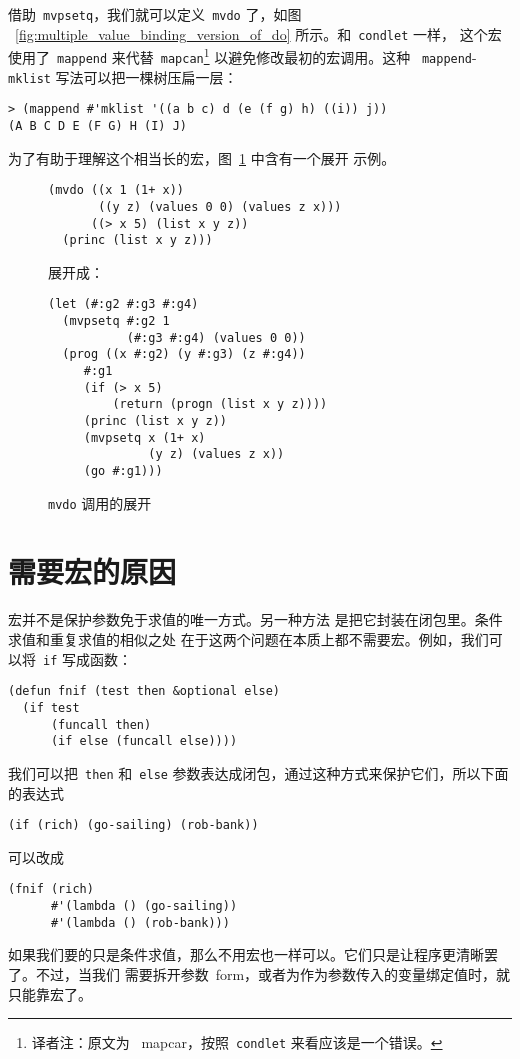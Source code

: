 借助~\verb|mvpsetq|，我们就可以定义~\verb|mvdo| 了，如图
~\ref{fig:multiple_value_binding_version_of_do} 所示。和~\verb|condlet| 一样，
这个宏使用了~\verb|mappend| 来代替~\verb|mapcan|\footnote{译者注：原文为
~mapcar，按照~\texttt{condlet} 来看应该是一个错误。} 以避免修改最初的宏调用。这种
~\verb|mappend|-\verb|mklist| 写法可以把一棵树压扁一层：
\begin{lstlisting}
> (mappend #'mklist '((a b c) d (e (f g) h) ((i)) j))
(A B C D E (F G) H (I) J)
\end{lstlisting}
为了有助于理解这个相当长的宏，图~\ref{fig:expansion_of_a_call_to_mvdo} 中含有一个展开
示例。

\begin{figure}
\begin{lstlisting}
(mvdo ((x 1 (1+ x))
       ((y z) (values 0 0) (values z x)))
      ((> x 5) (list x y z))
  (princ (list x y z)))
\end{lstlisting}
展开成：
\begin{lstlisting}
(let (#:g2 #:g3 #:g4)
  (mvpsetq #:g2 1
           (#:g3 #:g4) (values 0 0))
  (prog ((x #:g2) (y #:g3) (z #:g4))
     #:g1
     (if (> x 5)
         (return (progn (list x y z))))
     (princ (list x y z))
     (mvpsetq x (1+ x)
              (y z) (values z x))
     (go #:g1)))
\end{lstlisting}
  \caption{\texttt{mvdo} 调用的展开}
  \label{fig:expansion_of_a_call_to_mvdo}
\end{figure}

\section{需要宏的原因}
\label{sec:need_for_macros}

宏并不是保护参数免于求值的唯一方式。另一种方法
是把它封装在闭包里。条件求值和重复求值的相似之处
在于这两个问题在本质上都不需要宏。例如，我们可以将~\texttt{if} 写成函数：
\begin{lstlisting}
(defun fnif (test then &optional else)
  (if test
      (funcall then)
      (if else (funcall else))))
\end{lstlisting}
我们可以把~\texttt{then} 和~\texttt{else} 参数表达成闭包，通过这种方式来保护它们，所以下面的表达式
\begin{lstlisting}
(if (rich) (go-sailing) (rob-bank))
\end{lstlisting}
可以改成
\begin{lstlisting}
(fnif (rich)
      #'(lambda () (go-sailing))
      #'(lambda () (rob-bank)))
\end{lstlisting}
如果我们要的只是条件求值，那么不用宏也一样可以。它们只是让程序更清晰罢了。不过，当我们
需要拆开参数~form，或者为作为参数传入的变量绑定值时，就只能靠宏了。

